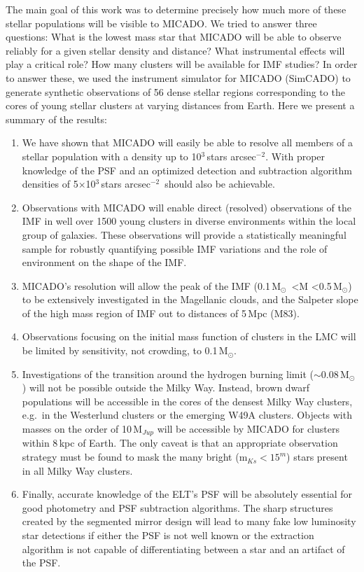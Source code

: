 \documentclass{aa}
\newcommand{\msun}{M$_\odot$~}
\newcommand{\msune}{M$_\odot$}
\newcommand{\s}{$\sim$}
\newcommand{\h}[1]{$^{#1}$}
\newcommand{\spa}{stars arcsec$^{-2}$~}
\newcommand{\spae}{stars arcsec$^{-2}$}
\begin{document}
The main goal of this work was to determine precisely how much more of these stellar populations will be visible to MICADO. We tried to answer three questions:
What is the lowest mass star that MICADO will be able to observe reliably for a given stellar density and distance?
What instrumental effects will play a critical role?
How many clusters will be available for IMF studies?
In order to answer these, we used the instrument simulator for MICADO (SimCADO) to generate synthetic observations of 56 dense stellar regions corresponding to the cores of young stellar clusters at varying distances from Earth.
Here we present a summary of the results:

\begin{enumerate}
    \item We have shown that MICADO will easily be able to resolve all members of a stellar population with a density up to 10\h3\,\spae.
    With proper knowledge of the PSF and an optimized detection and subtraction algorithm densities of 5$\times$10\h3\,\spa should also be achievable.

    \item Observations with MICADO will enable direct (resolved) observations of the IMF in well over 1500 young clusters in diverse environments within the local group of galaxies.
    These observations will provide a statistically meaningful sample for robustly quantifying possible IMF variations and the role of environment on the shape of the IMF\@.

    \item MICADO's resolution will allow the peak of the IMF (0.1\,\msun\textless M \textless0.5\,\msune) to be extensively investigated in the Magellanic clouds, and the Salpeter slope of the high mass region of IMF out to distances of 5\,Mpc (M83).

    \item Observations focusing on the initial mass function of clusters in the LMC will be limited by sensitivity, not crowding, to 0.1\,\msune.

    \item Investigations of the transition around the hydrogen burning limit (\s0.08\,\msune) will not be possible outside the Milky Way.
    Instead, brown dwarf populations will be accessible in the cores of the densest Milky Way clusters, e.g.\ in the Westerlund clusters or the emerging W49A clusters.
    Objects with masses on the order of 10\,M$_{Jup}$ will be accessible by MICADO for clusters within 8\,kpc of Earth.
    The only caveat is that an appropriate observation strategy must be found to mask the many bright (m$_{Ks}<15^m$) stars present in all Milky Way clusters.

    \item Finally, accurate knowledge of the ELT's PSF will be absolutely essential for good photometry and PSF subtraction algorithms.
    The sharp structures created by the segmented mirror design will lead to many fake low luminosity star detections if either the PSF is not well known or the extraction algorithm is not capable of differentiating between a star and an artifact of the PSF\@.

\end{enumerate}
\end{document}
